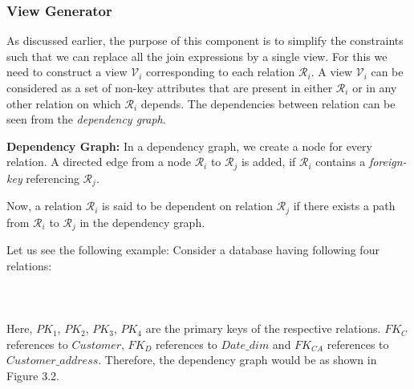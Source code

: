 \documentclass[]{article}
\begin{document}
\begin{multicols}{2}
			\subsubsection{View Generator}
			As discussed earlier, the purpose of this component is to simplify the constraints such that we can replace all the join expressions by a single view. 
			For this we need to construct a view $\mathcal{V}_{i}$ corresponding to each relation $\mathcal{R}_{i}$. 
			A view $\mathcal{V}_{i}$ can be considered as a set of non-key attributes that are present in either $\mathcal{R}_{i}$ or in any other relation on which $\mathcal{R}_{i}$ depends. 
			The dependencies between relation can be seen from the {\em dependency graph}.
			
			{\bf Dependency Graph:} 
			In a dependency graph, we create a node for every relation. 
			A directed edge from a node $\mathcal{R}_{i}$ to $\mathcal{R}_{j}$ is added, if $\mathcal{R}_{i}$ contains a {\em foreign-key} referencing $\mathcal{R}_{j}$.
			
			Now, a relation $\mathcal{R}_{i}$ is said to be dependent on relation $\mathcal{R}_{j}$ if there exists a path from $\mathcal{R}_{i}$ to $\mathcal{R}_{j}$ in the dependency graph.
		
			Let us see the following example: Consider a database having following four relations:
			\\ \\
			\\ \\
			Here, $PK_{1}$, $PK_{2}$, $PK_{3}$, $PK_{4}$ are the primary keys of the respective relations. 
			$FK_{C}$ references to $Customer$, $FK_{D}$ references to $Date\_dim$ and $FK_{CA}$ references to $Customer\_address$. 
			Therefore, the dependency graph would be as shown in Figure 3.2. 
			

\end{multicols}
\end{document}
